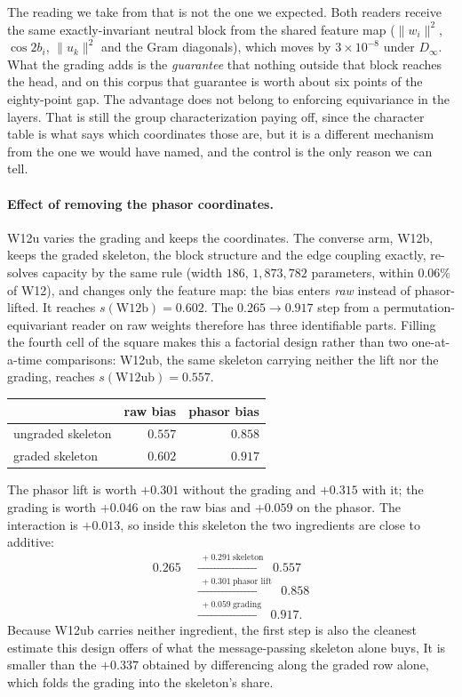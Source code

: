 \documentclass[10pt,twocolumn,letterpaper]{article}
\theoremstyle{definition}
\newcommand{\Dinf}{D_\infty}
\begin{document}
The reading we take from that is not the one we expected. Both readers receive the same
exactly-invariant neutral block from the shared feature map ($\|w_i\|^2$, $\cos 2b_i$,
$\|u_k\|^2$ and the Gram diagonals), which moves by $3\times10^{-8}$ under $\Dinf$. What the grading
adds is the \emph{guarantee} that nothing outside that block reaches the head, and on this corpus
that guarantee is worth about six points of the eighty-point gap. The advantage does not belong to
enforcing equivariance in the layers. That is still the group characterization paying off, since the character
table is what says which coordinates those are, but it is a different mechanism from the one we
would have named, and the control is the only reason we can tell.

\paragraph{Effect of removing the phasor coordinates.} W12u varies the
grading and keeps the coordinates. The converse arm, W12b, keeps the graded skeleton, the block
structure and the edge coupling exactly, re-solves capacity by the same rule (width $186$,
$1{,}873{,}782$ parameters, within $0.06\%$ of W12), and changes only the feature map: the bias
enters \emph{raw} instead of phasor-lifted. It reaches $s(\mathrm{W12b}) = \mathbf{0.602}$. The
$0.265 \to 0.917$ step from a permutation-equivariant reader on raw weights therefore has three
identifiable parts. Filling the fourth cell of the square makes this a factorial design rather than
two one-at-a-time comparisons: W12ub, the same skeleton carrying neither the lift nor the grading,
reaches $s(\mathrm{W12ub}) = \mathbf{0.557}$.

\begin{center}\small
\begin{tabular}{@{}lrr@{}}
\toprule
 & raw bias & phasor bias \\
\midrule
ungraded skeleton & $0.557$ & $0.858$ \\
graded skeleton   & $0.602$ & $0.917$ \\
\bottomrule
\end{tabular}
\end{center}

\noindent The phasor lift is worth $+0.301$ without the grading and $+0.315$ with it; the grading is
worth $+0.046$ on the raw bias and $+0.059$ on the phasor. The interaction is $\mathbf{+0.013}$, so
inside this skeleton the two ingredients are close to additive:
\[
\begin{aligned}
0.265 &\;\xrightarrow{\;+0.291\ \text{skeleton}\;}\; 0.557\\
&\;\xrightarrow{\;+0.301\ \text{phasor lift}\;}\; 0.858\\
&\;\xrightarrow{\;+0.059\ \text{grading}\;}\; 0.917 .
\end{aligned}
\]
Because W12ub carries neither ingredient, the first step is also the cleanest estimate this design
offers of what the message-passing skeleton alone buys, It is smaller than the $+0.337$ obtained by differencing
along the graded row alone, which folds the grading into the skeleton's share.
\end{document}
